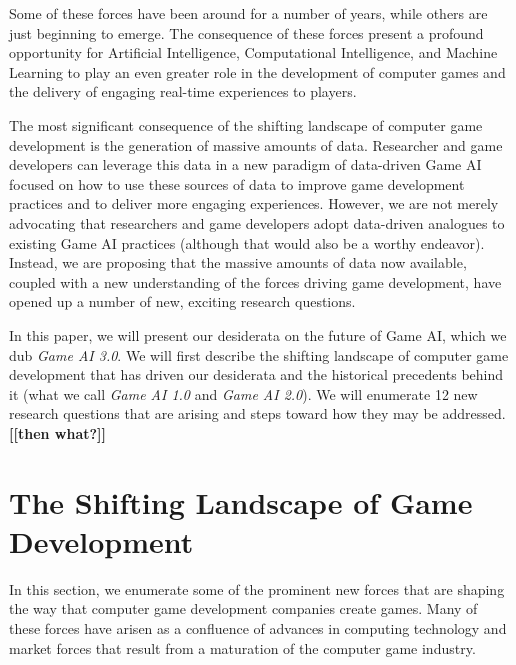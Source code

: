 \documentclass[conference]{IEEEtran}
\newcommand{\mytodo}[1]{\textbf{[[#1]]}}
\begin{document}
\noindent
Some of these forces have been around for a number of years, while others are just beginning to emerge.
The consequence of these forces present a profound opportunity for Artificial Intelligence, Computational Intelligence, and Machine Learning to play an even greater role in the development of computer games and the delivery of engaging real-time experiences to players. 

The most significant consequence of the shifting landscape of computer game development is the generation of massive amounts of data. 
Researcher and game developers can leverage this data in a new paradigm of data-driven Game AI focused on how to use these sources of data to 
improve game development practices and to deliver more engaging experiences.
However, we are not merely advocating that researchers and game developers adopt data-driven analogues to existing Game AI practices (although that would also be a worthy endeavor).
Instead, we are proposing that the massive amounts of data now available, coupled with a new understanding of the forces driving game development, have opened up a number of new, exciting research questions. 

In this paper, we will present our desiderata on the future of Game AI, which we dub {\em Game AI 3.0}.
We will first describe the shifting landscape of computer game development that has driven our desiderata and the historical precedents behind it (what we call {\em Game AI 1.0} and {\em Game AI 2.0}). 
We will enumerate 12 new research questions that are arising and steps toward how they may be addressed. 
\mytodo{then what?}


\section{The Shifting Landscape of Game Development}

In this section, we enumerate some of the prominent new forces that are shaping the way that computer game development companies create games. Many of these forces have arisen as a confluence of advances in computing technology and market forces that result from a maturation of the computer game industry.
\end{document}
